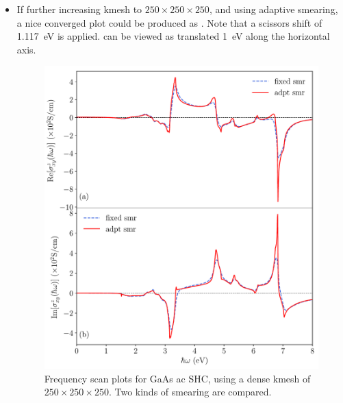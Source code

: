 \begin{itemize}
\item If further increasing kmesh to $250\times250\times250$, and using adaptive smearing, 
a nice converged plot could be produced as . 
Note that a scissors shift of 1.117~eV is applied. 
 can be viewed as  translated 
1~eV along the horizontal axis. 
\begin{figure}
\centering
\includegraphics[width=0.8\columnwidth]{figure/example30/gaas_freqscan.pdf}
\caption{Frequency scan plots for GaAs ac SHC, using 
	a dense kmesh of $250\times250\times250$. 
Two kinds of smearing are compared.}
\label{fig30.2}
\end{figure}
\end{itemize}